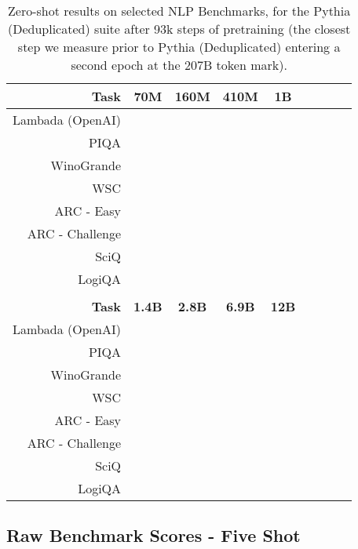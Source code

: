 \documentclass{article}
\theoremstyle{plain}
\theoremstyle{definition}
\theoremstyle{remark}
\begin{document}
\begin{table}[H]
\centering
\begin{tabular}{rcccccccc}
\toprule
\textbf{Task} & \textbf{70M} & \textbf{160M} & \textbf{410M} & \textbf{1B} \\
\midrule
Lambada (OpenAI) &  &  &  &  \\
PIQA &  &  &  &  \\
WinoGrande &  &  &  &  \\
WSC &  &  &  &  \\
ARC - Easy &  &  &  & \\
ARC - Challenge &  &  &  &  \\
SciQ &  &  &  &  \\
LogiQA &  &  &  &  \\
\bottomrule
\\
\textbf{Task} & \textbf{1.4B} & \textbf{2.8B} & \textbf{6.9B} & \textbf{12B} \\
\midrule
Lambada (OpenAI) &  &  &  &  \\
PIQA &  &  &  &  \\
WinoGrande &  &  &  &  \\
WSC &  &  &  &  \\
ARC - Easy &  &  &  &  \\
ARC - Challenge &  &  &  &  \\
SciQ &  &  &  &  \\
LogiQA &  &  &  &  \\
\bottomrule
\end{tabular}
\caption{Zero-shot results on selected NLP Benchmarks, for the Pythia (Deduplicated) suite after 93k steps of pretraining (the closest step we measure prior to Pythia (Deduplicated) entering a second epoch at the 207B token mark).}
\end{table}

\subsection{Raw Benchmark Scores - Five Shot}\label{app:raw-fiveshot}
\end{document}
